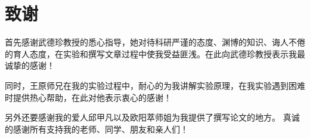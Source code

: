 \chapter*{致谢}
首先感谢武德珍教授的悉心指导，她对待科研严谨的态度、渊博的知识、诲人不倦的育人态度，在实验和撰写文章过程中使我受益匪浅。在此向武德珍教授表示我最诚挚的感谢！\par
同时，王原师兄在我的实验过程中，耐心的为我讲解实验原理，在我实验遇到困难时提供热心帮助，在此对他表示衷心的感谢！\par
另外还要感谢我的爱人邱甲凡以及欧阳萃师姐为我提供了撰写论文的地方。
真诚的感谢所有支持我的老师、同学、朋友和亲人们！
